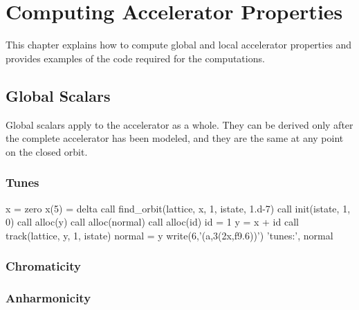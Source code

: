 
\chapter{Computing Accelerator Properties}
\label{cha:accel.properties}

This chapter explains how to compute global and local accelerator
properties and provides examples of the code required for the computations.


\section{Global Scalars}

%
Global scalars apply to the accelerator as a whole. They can be
derived only after the complete accelerator has been modeled, and
they are the same at any point on the closed orbit.


\subsection{Tunes}

\begin{ptccode}
x = zero
x(5) = delta
call find_orbit(lattice, x, 1, istate, 1.d-7)
call init(istate, 1, 0)
call alloc(y)
call alloc(normal)
call alloc(id)
id = 1
y = x + id
call track(lattice, y, 1, istate)
normal = y
write(6,'(a,3(2x,f9.6))') 'tunes:', normal%
\end{ptccode}


\subsection{Chromaticity}



\subsection{Anharmonicity}



